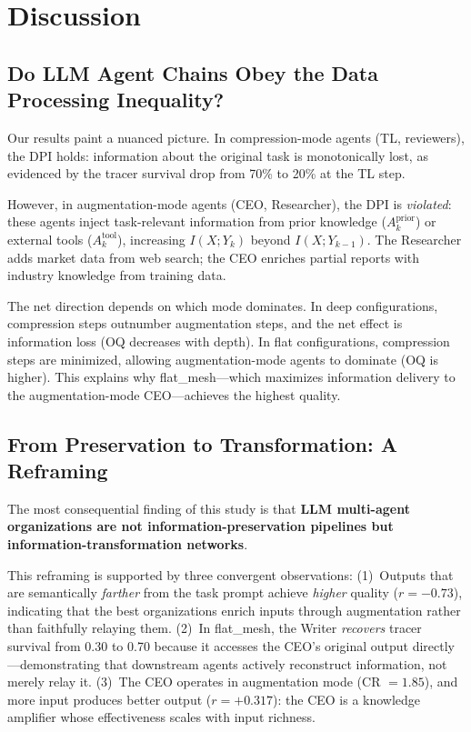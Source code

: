 \documentclass[conference]{IEEEtran}
\begin{document}
\section{Discussion}
\label{sec:discussion}

\subsection{Do LLM Agent Chains Obey the Data Processing Inequality?}

Our results paint a nuanced picture.
In compression-mode agents (TL, reviewers), the DPI holds: information about the original task is monotonically lost, as evidenced by the tracer survival drop from 70\% to 20\% at the TL step.

However, in augmentation-mode agents (CEO, Researcher), the DPI is \emph{violated}: these agents inject task-relevant information from prior knowledge ($A_k^{\text{prior}}$) or external tools ($A_k^{\text{tool}}$), increasing $I(X; Y_k)$ beyond $I(X; Y_{k-1})$.
The Researcher adds market data from web search; the CEO enriches partial reports with industry knowledge from training data.

The net direction depends on which mode dominates.
In deep configurations, compression steps outnumber augmentation steps, and the net effect is information loss (OQ decreases with depth).
In flat configurations, compression steps are minimized, allowing augmentation-mode agents to dominate (OQ is higher).
This explains why flat\_mesh---which maximizes information delivery to the augmentation-mode CEO---achieves the highest quality.

\subsection{From Preservation to Transformation: A Reframing}

The most consequential finding of this study is that \textbf{LLM multi-agent organizations are not information-preservation pipelines but information-transformation networks}.

This reframing is supported by three convergent observations:
(1)~Outputs that are semantically \emph{farther} from the task prompt achieve \emph{higher} quality ($r = -0.73$), indicating that the best organizations enrich inputs through augmentation rather than faithfully relaying them.
(2)~In flat\_mesh, the Writer \emph{recovers} tracer survival from 0.30 to 0.70 because it accesses the CEO's original output directly---demonstrating that downstream agents actively reconstruct information, not merely relay it.
(3)~The CEO operates in augmentation mode (CR $= 1.85$), and more input produces better output ($r = +0.317$): the CEO is a knowledge amplifier whose effectiveness scales with input richness.
\end{document}

